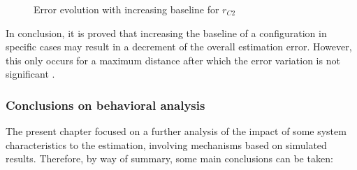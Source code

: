 \begin{figure}[!htbp]
	\captionsetup{justification=centering,margin=2cm}
	\caption{Error evolution with increasing baseline for $r_{C2}$}
	\label{fig:plot-baseline-increase-2}
\end{figure}

In conclusion, it is proved that increasing the baseline of a configuration in specific cases may result in a decrement of the overall estimation error. However, this only occurs for a maximum distance after which the error variation is not significant . 

\subsubsection{ Conclusions on behavioral analysis}

The present chapter focused on a further analysis of the impact of some system characteristics to the estimation, involving mechanisms based on simulated results. Therefore, by way of summary, some main conclusions can be taken:

